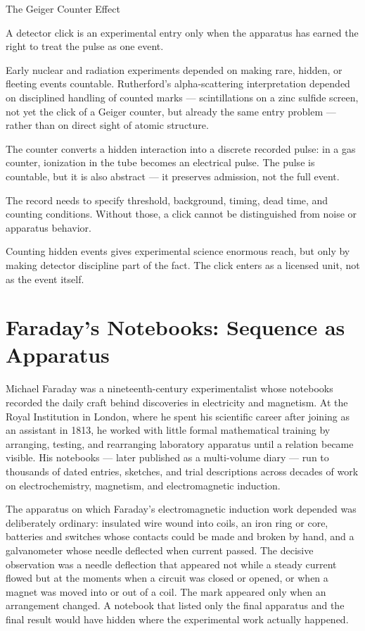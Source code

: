 \begin{phenom}{The Geiger Counter Effect~\cite{rutherford1911}}
\label{ph:geiger-counter}

\PhStatement
A detector click is an experimental entry only when the apparatus has earned
the right to treat the pulse as one event.

\PhOrigin
Early nuclear and radiation experiments depended on making rare, hidden, or
fleeting events countable. Rutherford's alpha-scattering interpretation
depended on disciplined handling of counted marks --- scintillations on a
zinc sulfide screen, not yet the click of a Geiger counter, but already the
same entry problem --- rather than on direct sight of atomic structure.

\PhObservation
The counter converts a hidden interaction into a discrete recorded pulse:
in a gas counter, ionization in the tube becomes an electrical pulse. The
pulse is countable, but it is also abstract --- it preserves admission, not
the full event.

\PhConstraint
The record needs to specify threshold, background, timing, dead time, and
counting conditions. Without those, a click cannot be distinguished from
noise or apparatus behavior.

\PhConsequence
Counting hidden events gives experimental science enormous reach, but only by
making detector discipline part of the fact. The click enters as a licensed
unit, not as the event itself.
\end{phenom}

\section{Faraday's Notebooks: Sequence as Apparatus}

Michael Faraday was a nineteenth-century experimentalist whose notebooks
recorded the daily craft behind discoveries in electricity and magnetism.
At the Royal Institution in London, where he spent his scientific career
after joining as an assistant in 1813, he worked with little formal
mathematical training by arranging, testing, and rearranging laboratory
apparatus until a relation became visible. His
notebooks --- later published as a multi-volume diary --- run to thousands
of dated entries, sketches, and trial descriptions across decades of
work on electrochemistry, magnetism, and electromagnetic induction.

The apparatus on which Faraday's electromagnetic induction work depended
was deliberately ordinary: insulated wire wound into coils, an iron ring
or core, batteries and switches whose contacts could be made and broken
by hand, and a galvanometer whose needle deflected when current passed.
The decisive observation was a needle deflection that appeared not while
a steady current flowed but at the moments when a circuit was closed or
opened, or when a magnet was moved into or out of a coil. The mark
appeared only when an arrangement changed. A notebook that listed only
the final apparatus and the final result would have hidden where the
experimental work actually happened.

